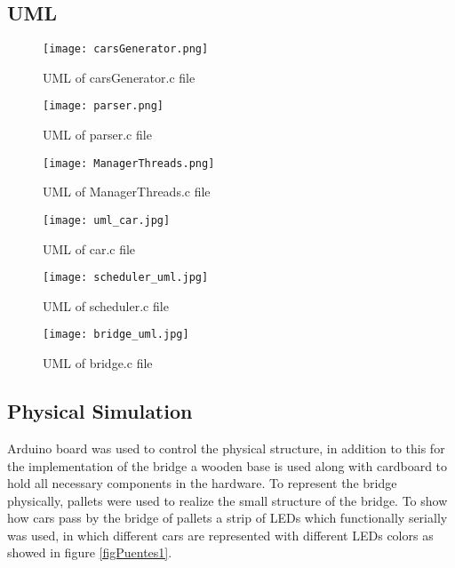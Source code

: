 \documentclass[a4paper,9pt]{article}
\begin{document}
\subsection{UML}

\begin{figure}[H]
\centering
\texttt{[image: carsGenerator.png]}
\caption{UML of carsGenerator.c file }
\label{figCarsGenerator}
 \end{figure} \bigskip

\begin{figure}[H]
\centering
\texttt{[image: parser.png]}
\caption{UML of parser.c file }
\label{figCarsGenerator}
 \end{figure} \bigskip

\begin{figure}[H]
\centering
\texttt{[image: ManagerThreads.png]}
\caption{UML of ManagerThreads.c file }
\label{figManagerThreads}
 \end{figure} \bigskip
 
\begin{figure}[H]
\centering
\texttt{[image: uml\_car.jpg]}
\caption{UML of car.c file }
\label{figcar}
 \end{figure} \bigskip
 
\begin{figure}[H]
\centering
\texttt{[image: scheduler\_uml.jpg]}
\caption{UML of scheduler.c file }
\label{figscheduler}
 \end{figure} \bigskip
 
 \begin{figure}[H]
\centering
\texttt{[image: bridge\_uml.jpg]}
\caption{UML of bridge.c file }
\label{figbridge}
 \end{figure} \bigskip

\subsection{Physical Simulation}

Arduino board was used to control the physical structure, in addition to this for the implementation of the bridge a wooden base is used along with cardboard to hold all necessary components in the hardware.
To represent the bridge physically, pallets were used to realize the small structure of the bridge. To show how cars pass by the bridge of pallets a strip of LEDs which functionally serially was used, in which different cars are represented with different LEDs colors as showed in figure \ref{figPuentes1}.
\end{document}

